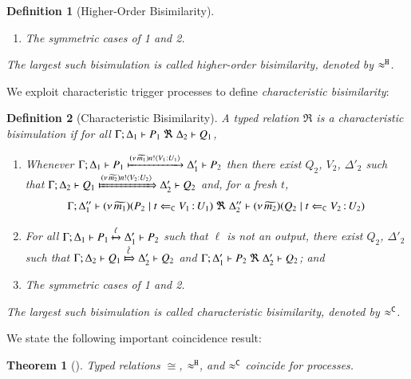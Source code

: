 \documentclass[preprint,11pt]{elsarticle}
\newtheorem{definition}{Definition}[section]
\newtheorem{theorem}{Theorem}[section]
\begin{document}
{{\begin{definition}[Higher-Order Bisimilarity]
\begin{enumerate}[1)]
		\item	The symmetric cases of 1 and 2.                
	\end{enumerate}
%
	The largest such bisimulation is called \emph{higher-order bisimilarity}, denoted by $\approx^\mathtt{H}$.
\end{definition}


We exploit characteristic trigger processes to define \emph{characteristic bisimilarity}: 

\begin{definition}[Characteristic Bisimilarity]
\label{d:fwb}
	A typed relation $\Re$ is a {\em  characteristic bisimulation} if 
	for all $\horel{\Gamma}{\Delta_1}{P_1}{\ \Re \ }{\Delta_2}{Q_1}$, 
%
	\begin{enumerate}[1)]
		\item 
				Whenever 
				$\Gamma; \Delta_1 \vdash P_1 \xmapsto{(\nu\, \widetilde{m_1}) n !\langle V_1: U_1 \rangle} \Delta_1' \vdash P_2$ 
				then there exist 
				$Q_2$, $V_2$, $\Delta'_2$ such that 
				$\horel{\Gamma}{\Delta_2}{Q_1}{\Hby{\news{\widetilde{m_2}}\bactout{n}{V_2: U_2}}}{\Delta_2'}{Q_2}$
				and, for a fresh $t$,
%
				\[
					\Gamma; \Delta''_1  \proves  {\newsp{\widetilde{m_1}}{P_2 \Par \ftrigger{t}{V_1}{U_1}}}
	 				\ \Re\ 
					\Delta''_2 \proves {\newsp{\widetilde{m_2}}{Q_2 \Par \ftrigger{t}{V_2}{U_2}}}
				\]

		\item	
				For all $\Gamma; \Delta_1 \vdash P_1 \xmapsto{\ell} \Delta_1' \vdash P_2$ such that 
				$\ell$ is not an output, there exist $Q_2$, $\Delta'_2$ such that 
				$\horel{\Gamma}{\Delta_2}{Q_1}{\Hby{\hat{\ell}}}{\Delta_2'}{Q_2}$
				and
				$\horel{\Gamma}{\Delta_1'}{P_2}{\ \Re \ }{\Delta_2'}{Q_2}$; and 

		\item	The symmetric cases of 1 and 2.                
	\end{enumerate}
%
	The largest such bisimulation is called \emph{characteristic bisimilarity}, denoted by $\approx^\mathtt{C}$.
\end{definition}




We state the following important coincidence result: %
\begin{theorem}[\cite{KouzapasPY17}]\label{t:coincide}
	Typed relations $\cong$, $\approx^\mathtt{H}$, and $\approx^\mathtt{C}$ coincide for \HOp processes.
\end{theorem}


}}
\end{document}
